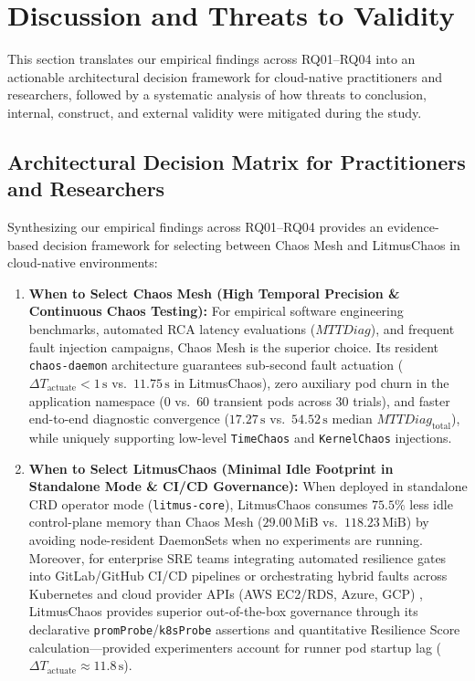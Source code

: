 \section{Discussion and Threats to Validity}
\label{sec:discussion}

This section translates our empirical findings across RQ01--RQ04 into an actionable architectural decision framework for cloud-native practitioners and researchers, followed by a systematic analysis of how threats to conclusion, internal, construct, and external validity were mitigated during the study.

\subsection{Architectural Decision Matrix for Practitioners and Researchers}
Synthesizing our empirical findings across RQ01--RQ04 provides an evidence-based decision framework for selecting between Chaos Mesh and LitmusChaos in cloud-native environments:
\begin{enumerate}
    \item \textbf{When to Select Chaos Mesh (High Temporal Precision \& Continuous Chaos Testing):} For empirical software engineering benchmarks, automated RCA latency evaluations ($MTTDiag$), and frequent fault injection campaigns, Chaos Mesh is the superior choice. Its resident \texttt{chaos-daemon} architecture guarantees sub-second fault actuation ($\Delta T_{\text{actuate}} < 1\,\text{s}$ vs.\ $11.75\,\text{s}$ in LitmusChaos), zero auxiliary pod churn in the application namespace ($0$ vs.\ $60$ transient pods across $30$ trials), and faster end-to-end diagnostic convergence ($17.27\,\text{s}$ vs.\ $54.52\,\text{s}$ median $MTTDiag_{\text{total}}$), while uniquely supporting low-level \texttt{TimeChaos} and \texttt{KernelChaos} injections.
    \item \textbf{When to Select LitmusChaos (Minimal Idle Footprint in Standalone Mode \& CI/CD Governance):} When deployed in standalone CRD operator mode (\texttt{litmus-core}), LitmusChaos consumes $75.5\%$ less idle control-plane memory than Chaos Mesh ($29.00\,\text{MiB}$ vs.\ $118.23\,\text{MiB}$) by avoiding node-resident DaemonSets when no experiments are running. Moreover, for enterprise SRE teams integrating automated resilience gates into GitLab/GitHub CI/CD pipelines or orchestrating hybrid faults across Kubernetes and cloud provider APIs (AWS EC2/RDS, Azure, GCP) \cite{onkalo2025improving, opara2025chaos}, LitmusChaos provides superior out-of-the-box governance through its declarative \texttt{promProbe}/\texttt{k8sProbe} assertions and quantitative Resilience Score calculation—provided experimenters account for runner pod startup lag ($\Delta T_{\text{actuate}} \approx 11.8\,\text{s}$).
\end{enumerate}

